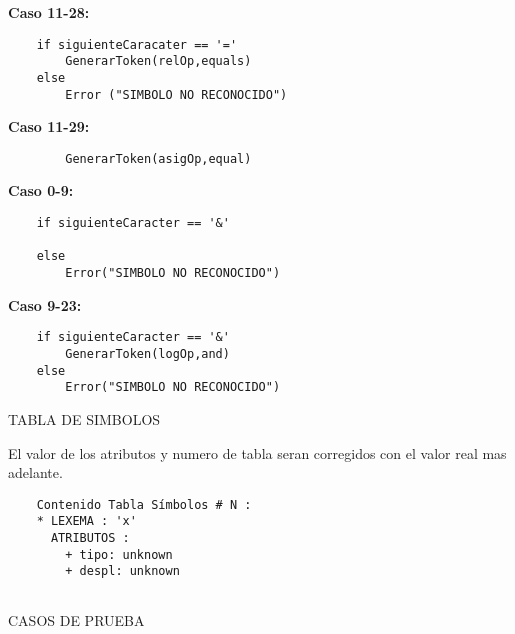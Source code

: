 \documentclass{article}
\begin{document}
\textbf{Caso 11-28:}
\begin{verbatim}
    if siguienteCaracater == '='
        GenerarToken(relOp,equals)
    else 
        Error ("SIMBOLO NO RECONOCIDO")  
\end{verbatim}

\textbf{Caso 11-29:}
\begin{verbatim}
        GenerarToken(asigOp,equal)
\end{verbatim}
\newpage
\textbf{Caso 0-9:}
\begin{verbatim}
    if siguienteCaracter == '&'
        
    else
        Error("SIMBOLO NO RECONOCIDO")
\end{verbatim}

\textbf{Caso 9-23:}
\begin{verbatim}
    if siguienteCaracter == '&'
        GenerarToken(logOp,and)
    else
        Error("SIMBOLO NO RECONOCIDO")
\end{verbatim}

\vspace*{1cm}

\begin{center}
    TABLA DE SIMBOLOS\\
    \end{center}
\vspace*{1cm}
El valor de los atributos y numero de tabla seran corregidos con el valor real mas adelante.
\begin{verbatim}
    Contenido Tabla Símbolos # N :
    * LEXEMA : 'x'
      ATRIBUTOS :
        + tipo: unknown
        + despl: unknown
    
\end{verbatim}
\newpage

\begin{center}
    CASOS DE PRUEBA\\
\end{center}
\end{document}
